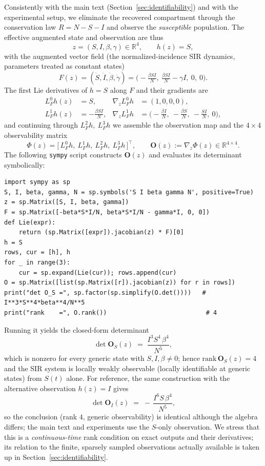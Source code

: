 Consistently with the main text (Section~\ref{sec:identifiability}) and with the experimental setup, we
eliminate the recovered compartment through the conservation law $R = N - S - I$ and observe the
\emph{susceptible} population. The effective augmented state and observation are thus
\[
z = (S,I,\beta,\gamma)\in\mathbb{R}^4,
\qquad
h(z)=S,
\]
with the augmented vector field (the normalized-incidence SIR dynamics, parameters treated as constant states)
\[
F(z) = (\dot S,\dot I,\dot\beta,\dot\gamma)
=
\Big(-\tfrac{\beta S I}{N},\ \tfrac{\beta S I}{N}-\gamma I,\ 0,\ 0\Big).
\]
The first Lie derivatives of $h=S$ along $F$ and their gradients are
\begin{align*}
L_F^0 h(z) &= S, & \nabla_z L_F^0 h &= (1,0,0,0),\\
L_F^1 h(z) &= -\tfrac{\beta S I}{N}, & \nabla_z L_F^1 h &= \Big(-\tfrac{\beta I}{N},\ -\tfrac{\beta S}{N},\ -\tfrac{SI}{N},\ 0\Big),
\end{align*}
and continuing through $L_F^2 h,\ L_F^3 h$ we assemble the observation map and the $4\times4$ observability matrix
\[
\Phi(z)=\big[\,L_F^0 h,\ L_F^1 h,\ L_F^2 h,\ L_F^3 h\,\big]^\top,
\qquad
\mathbf{O}(z) := \nabla_z \Phi(z)\in\mathbb{R}^{4\times 4}.
\]
The following \texttt{sympy} script constructs $\mathbf{O}(z)$ and evaluates its determinant symbolically:
\begin{verbatim}
import sympy as sp
S, I, beta, gamma, N = sp.symbols('S I beta gamma N', positive=True)
z = sp.Matrix([S, I, beta, gamma])
F = sp.Matrix([-beta*S*I/N, beta*S*I/N - gamma*I, 0, 0])
def Lie(expr):
    return (sp.Matrix([expr]).jacobian(z) * F)[0]
h = S
rows, cur = [h], h
for _ in range(3):
    cur = sp.expand(Lie(cur)); rows.append(cur)
O = sp.Matrix([list(sp.Matrix([r]).jacobian(z)) for r in rows])
print("det O_S =", sp.factor(sp.simplify(O.det())))   # I**3*S**4*beta**4/N**5
print("rank    =", O.rank())                           # 4
\end{verbatim}
Running it yields the closed-form determinant
\[
\det \mathbf{O}_S(z) \;=\; \frac{I^{3} S^{4}\,\beta^{4}}{N^{5}},
\]
which is nonzero for every generic state with $S,I,\beta\neq 0$; hence $\mathrm{rank}\,\mathbf{O}_S(z)=4$ and the
SIR system is locally weakly observable (locally identifiable at generic states) from $S(t)$ alone. For reference, the same construction with the
alternative observation $h(z)=I$ gives
\[
\det \mathbf{O}_I(z) \;=\; -\,\frac{I^{6} S\,\beta^{4}}{N^{5}},
\]
so the conclusion (rank $4$, generic observability) is identical although the algebra differs; the main text and
experiments use the $S$-only observation. We stress that this is a \emph{continuous-time} rank condition on exact
outputs and their derivatives; its relation to the finite, sparsely sampled observations actually available is
taken up in Section~\ref{sec:identifiability}.

